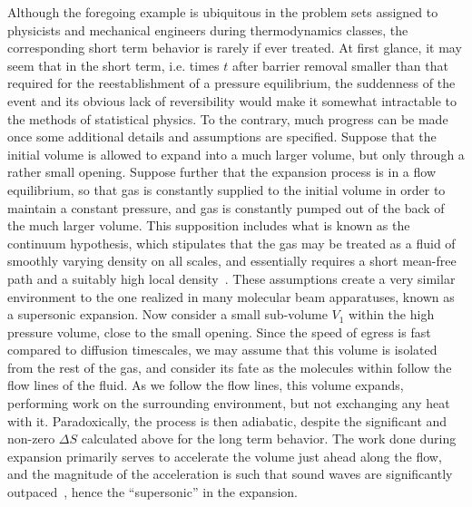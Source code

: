 Although the foregoing example is ubiquitous in the problem sets assigned to physicists and mechanical engineers during thermodynamics classes, the corresponding short term behavior is rarely if ever treated.
At first glance, it may seem that in the short term, i.e. times $t$ after barrier removal smaller than that required for the reestablishment of a pressure equilibrium, the suddenness of the event and its obvious lack of reversibility would make it somewhat intractable to the methods of statistical physics.
To the contrary, much progress can be made once some additional details and assumptions are specified.
Suppose that the initial volume is allowed to expand into a much larger volume, but only through a rather small opening.
Suppose further that the expansion process is in a flow equilibrium, so that gas is constantly supplied to the initial volume in order to maintain a constant pressure, and gas is constantly pumped out of the back of the much larger volume.
This supposition includes what is known as the continuum hypothesis, which stipulates that the gas may be treated as a fluid of smoothly varying density on all scales, and essentially requires a short mean-free path and a suitably high local density~\citep[Sec.~1.2]{Batchelor1967}.
These assumptions create a very similar environment to the one realized in many molecular beam apparatuses, known as a supersonic expansion.
Now consider a small sub-volume $V_1$ within the high pressure volume, close to the small opening.
Since the speed of egress is fast compared to diffusion timescales, we may assume that this volume is isolated from the rest of the gas, and consider its fate as the molecules within follow the flow lines of the fluid.
As we follow the flow lines, this volume expands, performing work on the surrounding environment, but not exchanging any heat with it.
Paradoxically, the process is then adiabatic, despite the significant and non-zero $\Delta S$ calculated above for the long term behavior.
The work done during expansion primarily serves to accelerate the volume just ahead along the flow, and the magnitude of the acceleration is such that sound waves are significantly outpaced~\cite{Miller1988,StuhlThesis2012}, hence the ``supersonic'' in the expansion.

